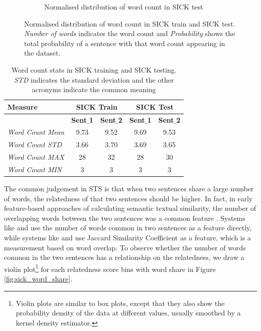 \begin{enumerate}
\begin{figure}
\begin{subfigure}[b]{.5\textwidth}
		\caption{Normalised distribution of word count in SICK test}
		\label{fig:sick_test_words}
	\end{subfigure}
	\caption[Normalised distribution of word count in SICK train and SICK test.]{Normalised distribution of word count in SICK train and SICK test. \textit{Number of words} indicates the word count and \textit{Probability} shows the total probability of a sentence with that word count appearing in the dataset.}
	\label{fig:sick_words}
\end{figure}


\begin{table}
	\centering
	\begin{tabular}{l|cc|cc}
		\hline
		Measure   & \multicolumn{2}{c|}{SICK Train} & \multicolumn{2}{c}{SICK Test} \\
		\hline
		\multicolumn{1}{l|}{} & \textbf{Sent$\_$1} & \textbf{Sent$\_$2} & \textbf{Sent$\_$1} & \textbf{Sent$\_$2} \\
		\textit{Word Count Mean} & 9.73 & 9.52 & 9.69 & 9.53  \\
		\textit{Word Count STD} & 3.66 & 3.70 & 3.69 & 3.65  \\
		\textit{Word Count MAX} & 28 & 32 & 28 & 30  \\
		\textit{Word Count MIN} & 3 & 3 & 3 & 3  \\
		\hline
	\end{tabular}
	\caption[Word count stats in SICK]{Word count stats in SICK training and SICK testing. \textit{STD} indicates the standard deviation and the other acronyms indicate the common meaning }
	\label{table:sick_sts}
\end{table}



The common judgement in STS is that when two sentences share a large number of words, the relatedness of that two sentences should be higher. In fact, in early feature-based approaches of calculating semantic textual similarity, the number of overlapping words between the two sentences was a common feature \autocite{vilarino-etal-2014-buap,  gupta-etal-2014-uow, lynum-etal-2014-ntnu, chavez-etal-2014-umcc}. Systems like \textcite{vilarino-etal-2014-buap} and \textcite{lynum-etal-2014-ntnu} use the number of words common in two sentences as a feature directly, while systems like \textcite{gupta-etal-2014-uow} and \textcite{chavez-etal-2014-umcc} use Jaccard Similarity Coefficient as a feature, which is a measurement based on word overlap. To observe whether the number of words common in the two sentences has a relationship on the relatedness, we draw a violin plot\footnote{Violin plots are similar to box plots, except that they also show the probability density of the data at different values, usually smoothed by a kernel density estimator.} for each relatedness score bins with word share in Figure \ref{fig:sick_word_share}.



\end{enumerate}
